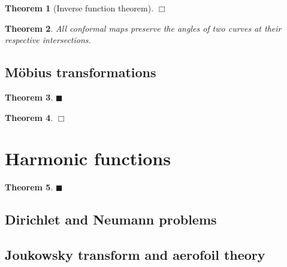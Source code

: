 \documentclass[letter-paper]{tufte-book}
\newtheorem{theorem}{\color{pastel-blue}Theorem}[section]
\newcommand{\qed}{\hfill$\blacksquare$}
\newcommand{\qedwhite}{\hfill \ensuremath{\Box}}
\begin{document}
\begin{theorem}[Inverse function theorem]

\qedwhite

\end{theorem}

\begin{theorem}
  All conformal maps preserve the angles of two curves at their respective
  intersections.
\end{theorem}


\subsection{M\"obius transformations}

\begin{theorem}

\qed

\end{theorem}

\begin{theorem}

\qedwhite

\end{theorem}


\section{Harmonic functions}

\begin{theorem}

\qed

\end{theorem}


\subsection{Dirichlet and Neumann problems}


\subsection{Joukowsky transform and aerofoil theory}


\end{document}
